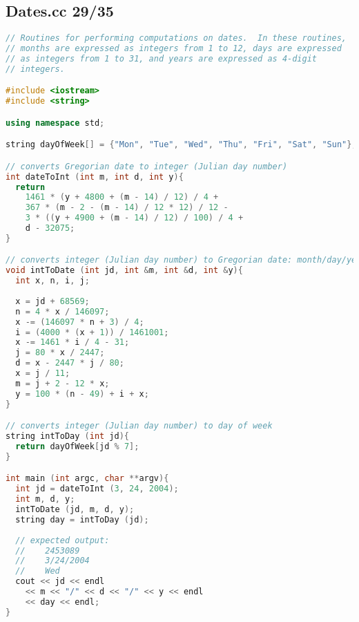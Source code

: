 \subsection{Dates.cc 29/35}
\begin{lstlisting}[language=C++]
// Routines for performing computations on dates.  In these routines,
// months are expressed as integers from 1 to 12, days are expressed
// as integers from 1 to 31, and years are expressed as 4-digit
// integers.

#include <iostream>
#include <string>

using namespace std;

string dayOfWeek[] = {"Mon", "Tue", "Wed", "Thu", "Fri", "Sat", "Sun"};

// converts Gregorian date to integer (Julian day number)
int dateToInt (int m, int d, int y){  
  return 
    1461 * (y + 4800 + (m - 14) / 12) / 4 +
    367 * (m - 2 - (m - 14) / 12 * 12) / 12 - 
    3 * ((y + 4900 + (m - 14) / 12) / 100) / 4 + 
    d - 32075;
}

// converts integer (Julian day number) to Gregorian date: month/day/year
void intToDate (int jd, int &m, int &d, int &y){
  int x, n, i, j;
  
  x = jd + 68569;
  n = 4 * x / 146097;
  x -= (146097 * n + 3) / 4;
  i = (4000 * (x + 1)) / 1461001;
  x -= 1461 * i / 4 - 31;
  j = 80 * x / 2447;
  d = x - 2447 * j / 80;
  x = j / 11;
  m = j + 2 - 12 * x;
  y = 100 * (n - 49) + i + x;
}

// converts integer (Julian day number) to day of week
string intToDay (int jd){
  return dayOfWeek[jd % 7];
}

int main (int argc, char **argv){
  int jd = dateToInt (3, 24, 2004);
  int m, d, y;
  intToDate (jd, m, d, y);
  string day = intToDay (jd);
  
  // expected output:
  //    2453089
  //    3/24/2004
  //    Wed
  cout << jd << endl
    << m << "/" << d << "/" << y << endl
    << day << endl;
}
\end{lstlisting}
